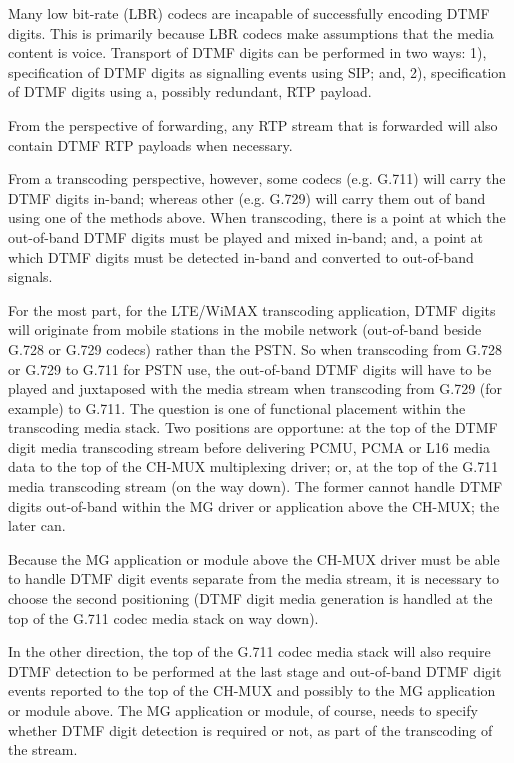\documentclass[letterpaper,final,notitlepage,twocolumn,10pt,twoside]{article}
\begin{document}
Many low bit-rate (LBR) codecs are incapable of successfully encoding DTMF
digits.  This is primarily because LBR codecs make assumptions that the media
content is voice.  Transport of DTMF digits can be performed in two ways: 1),
specification of DTMF digits as signalling events using SIP; and, 2),
specification of DTMF digits using a, possibly redundant, RTP payload.

From the perspective of forwarding, any RTP stream that is forwarded will also
contain DTMF RTP payloads when necessary.

From a transcoding perspective, however, some codecs (e.g. G.711) will carry the
DTMF digits in-band; whereas other (e.g. G.729) will carry them out of band
using one of the methods above.  When transcoding, there is a point at which the
out-of-band DTMF digits must be played and mixed in-band; and, a point at which
DTMF digits must be detected in-band and converted to out-of-band signals.

For the most part, for the LTE/WiMAX transcoding application, DTMF digits will
originate from mobile stations in the mobile network (out-of-band beside G.728
or G.729 codecs) rather than the PSTN.  So when transcoding from G.728 or G.729
to G.711 for PSTN  use, the out-of-band DTMF digits will have to be played and
juxtaposed with the media stream when transcoding from G.729 (for example) to
G.711.  The question is one of functional placement within the transcoding media
stack.  Two positions are opportune: at the top of the DTMF digit media
transcoding stream before delivering PCMU, PCMA or L16 media data to the top of
the CH-MUX multiplexing driver; or, at the top of the G.711 media transcoding
stream (on the way down).  The former cannot handle DTMF digits out-of-band
within the MG driver or application above the CH-MUX; the later can.

Because the MG application or module above the CH-MUX driver must be able to
handle DTMF digit events separate from the media stream, it is necessary to
choose the second positioning (DTMF digit media generation is handled at the top
of the G.711 codec media stack on way down).

In the other direction, the top of the G.711 codec media stack will also require
DTMF detection to be performed at the last stage and out-of-band DTMF digit
events reported to the top of the CH-MUX and possibly to the MG application or
module above.  The MG application or module, of course, needs to specify whether
DTMF digit detection is required or not, as part of the transcoding of the
stream.
\end{document}
